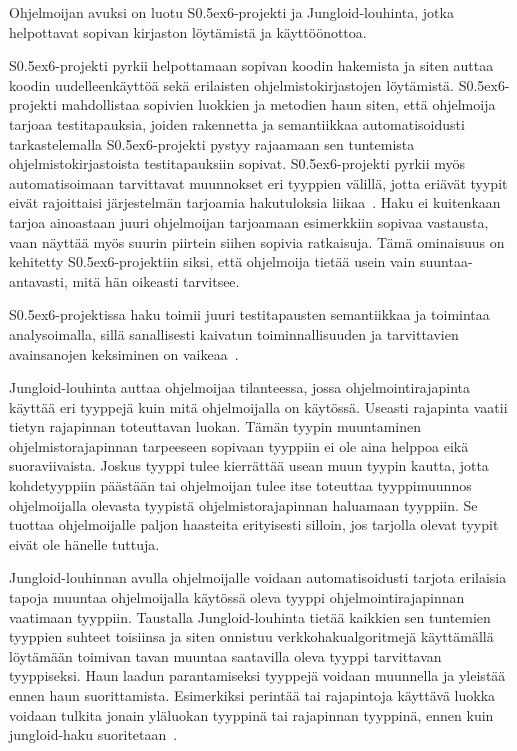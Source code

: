 \documentclass[finnish]{tktltiki2}
\theoremstyle{definition}
\theoremstyle{remark}
\begin{document}
Ohjelmoijan avuksi on luotu S\raise0.5ex\hbox{6}-projekti ja Jungloid-louhinta, jotka helpottavat sopivan kirjaston löytämistä ja käyttöönottoa.

S\raise0.5ex\hbox{6}-projekti pyrkii helpottamaan sopivan koodin hakemista ja siten auttaa koodin uudelleenkäyttöä sekä erilaisten ohjelmistokirjastojen löytämistä. S\raise0.5ex\hbox{6}-projekti mahdollistaa sopivien luokkien ja metodien haun siten, että ohjelmoija tarjoaa testitapauksia, joiden rakennetta ja semantiikkaa automatisoidusti tarkastelemalla S\raise0.5ex\hbox{6}-projekti pystyy rajaamaan sen tuntemista ohjelmistokirjastoista testitapauksiin sopivat. S\raise0.5ex\hbox{6}-projekti pyrkii myös automatisoimaan tarvittavat muunnokset eri tyyppien välillä, jotta eriävät tyypit eivät rajoittaisi järjestelmän tarjoamia hakutuloksia liikaa~\cite{what-to-search-for}. Haku ei kuitenkaan tarjoa ainoastaan juuri ohjelmoijan tarjoamaan esimerkkiin sopivaa vastausta, vaan näyttää myös suurin piirtein siihen sopivia ratkaisuja. Tämä ominaisuus on kehitetty S\raise0.5ex\hbox{6}-projektiin siksi, että ohjelmoija tietää usein vain suuntaa-antavasti, mitä hän oikeasti tarvitsee.

S\raise0.5ex\hbox{6}-projektissa haku toimii juuri testitapausten semantiikkaa ja toimintaa analysoimalla, sillä sanallisesti kaivatun toiminnallisuuden ja tarvittavien avainsanojen keksiminen on vaikeaa~\cite{what-to-search-for}.

Jungloid-louhinta auttaa ohjelmoijaa tilanteessa, jossa ohjelmointirajapinta käyttää eri tyyppejä kuin mitä ohjelmoijalla on käytössä. Useasti rajapinta vaatii tietyn rajapinnan toteuttavan luokan. Tämän tyypin muuntaminen ohjelmistorajapinnan tarpeeseen sopivaan tyyppiin ei ole aina helppoa eikä suoraviivaista. Joskus tyyppi tulee kierrättää usean muun tyypin kautta, jotta kohdetyyppiin päästään tai ohjelmoijan tulee itse toteuttaa tyyppimuunnos ohjelmoijalla olevasta tyypistä ohjelmistorajapinnan haluamaan tyyppiin. Se tuottaa ohjelmoijalle paljon haasteita erityisesti silloin, jos tarjolla olevat tyypit eivät ole hänelle tuttuja.

Jungloid-louhinnan avulla ohjelmoijalle voidaan automatisoidusti tarjota erilaisia tapoja muuntaa ohjelmoijalla käytössä oleva tyyppi ohjelmointirajapinnan vaatimaan tyyppiin. Taustalla Jungloid-louhinta tietää kaikkien sen tuntemien tyyppien suhteet toisiinsa ja siten onnistuu verkkohakualgoritmejä käyttämällä löytämään toimivan tavan muuntaa saatavilla oleva tyyppi tarvittavan tyyppiseksi. Haun laadun parantamiseksi tyyppejä voidaan muunnella ja yleistää ennen haun suorittamista. Esimerkiksi perintää tai rajapintoja käyttävä luokka voidaan tulkita jonain yläluokan tyyppinä tai rajapinnan tyyppinä, ennen kuin jungloid-haku suoritetaan~\cite{jungloid-mining}.
\end{document}
